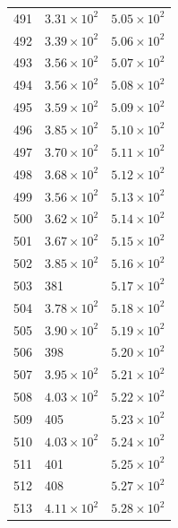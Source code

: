 \begin{table}[H]
\begin{tabular}{lll}
491 & $\displaystyle 3.31 \times 10^{2}$ & $\displaystyle 5.05 \times 10^{2}$ \\
492 & $\displaystyle 3.39 \times 10^{2}$ & $\displaystyle 5.06 \times 10^{2}$ \\
493 & $\displaystyle 3.56 \times 10^{2}$ & $\displaystyle 5.07 \times 10^{2}$ \\
494 & $\displaystyle 3.56 \times 10^{2}$ & $\displaystyle 5.08 \times 10^{2}$ \\
495 & $\displaystyle 3.59 \times 10^{2}$ & $\displaystyle 5.09 \times 10^{2}$ \\
496 & $\displaystyle 3.85 \times 10^{2}$ & $\displaystyle 5.10 \times 10^{2}$ \\
497 & $\displaystyle 3.70 \times 10^{2}$ & $\displaystyle 5.11 \times 10^{2}$ \\
498 & $\displaystyle 3.68 \times 10^{2}$ & $\displaystyle 5.12 \times 10^{2}$ \\
499 & $\displaystyle 3.56 \times 10^{2}$ & $\displaystyle 5.13 \times 10^{2}$ \\
500 & $\displaystyle 3.62 \times 10^{2}$ & $\displaystyle 5.14 \times 10^{2}$ \\
501 & $\displaystyle 3.67 \times 10^{2}$ & $\displaystyle 5.15 \times 10^{2}$ \\
502 & $\displaystyle 3.85 \times 10^{2}$ & $\displaystyle 5.16 \times 10^{2}$ \\
503 & 381 & $\displaystyle 5.17 \times 10^{2}$ \\
504 & $\displaystyle 3.78 \times 10^{2}$ & $\displaystyle 5.18 \times 10^{2}$ \\
505 & $\displaystyle 3.90 \times 10^{2}$ & $\displaystyle 5.19 \times 10^{2}$ \\
506 & 398 & $\displaystyle 5.20 \times 10^{2}$ \\
507 & $\displaystyle 3.95 \times 10^{2}$ & $\displaystyle 5.21 \times 10^{2}$ \\
508 & $\displaystyle 4.03 \times 10^{2}$ & $\displaystyle 5.22 \times 10^{2}$ \\
509 & 405 & $\displaystyle 5.23 \times 10^{2}$ \\
510 & $\displaystyle 4.03 \times 10^{2}$ & $\displaystyle 5.24 \times 10^{2}$ \\
511 & 401 & $\displaystyle 5.25 \times 10^{2}$ \\
512 & 408 & $\displaystyle 5.27 \times 10^{2}$ \\
513 & $\displaystyle 4.11 \times 10^{2}$ & $\displaystyle 5.28 \times 10^{2}$ \\

\end{tabular}
\end{table}
